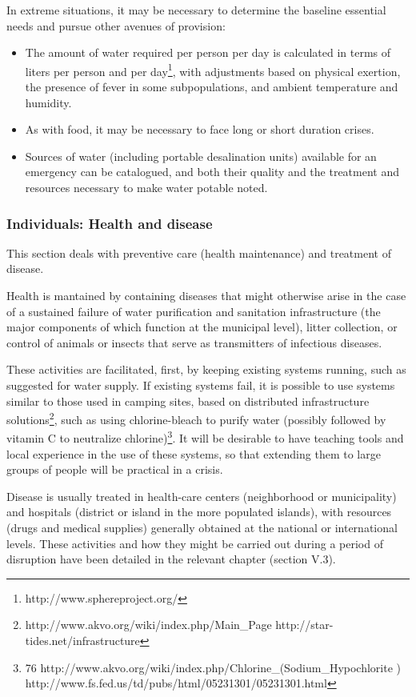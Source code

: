 \documentclass[12pt, a4]{scrartcl}
\begin{document}
In extreme situations, it may be necessary to determine the baseline essential needs and pursue other avenues of provision:

\begin{itemize}
	\item The amount of water required per person per day is calculated in terms of liters per person and per day\footnote{http://www.sphereproject.org/}, with adjustments based on physical exertion, the presence of fever in some subpopulations, and ambient temperature and humidity.
	\item As with food, it may be necessary to face long or short duration crises.
	\item Sources of water (including portable desalination units) available for an emergency can be catalogued, and both their quality and the treatment and resources necessary to make water potable noted.
\end{itemize}

\subsubsection{Individuals: Health and disease}
This section deals with preventive care (health maintenance) and treatment of disease.

Health is mantained by containing diseases that might otherwise arise in the case of a sustained failure of water purification and sanitation infrastructure (the major components of which function at the municipal level), litter collection, or control of animals or insects that serve as transmitters of infectious diseases.

These activities are facilitated, first, by keeping existing systems running, such as suggested for water supply. If existing systems fail, it is possible to use systems similar to those used in camping sites, based on distributed infrastructure solutions\footnote{http://www.akvo.org/wiki/index.php/Main_Page http://star-tides.net/infrastructure}, such as using chlorine-bleach to purify water (possibly followed by vitamin C to neutralize chlorine)\footnote{76 http://www.akvo.org/wiki/index.php/Chlorine_(Sodium_Hypochlorite ) http://www.fs.fed.us/td/pubs/html/05231301/05231301.html}. It will be desirable to have teaching tools and local experience in the use of these systems, so that extending them to large groups of people will be practical in a crisis.

Disease is usually treated in health-care centers (neighborhood or municipality) and hospitals (district or island in the more populated islands), with resources (drugs and medical supplies) generally obtained at the national or international levels. These activities and how they might be carried out during a period of disruption have been detailed in the relevant chapter (section V.3).
\end{document}
